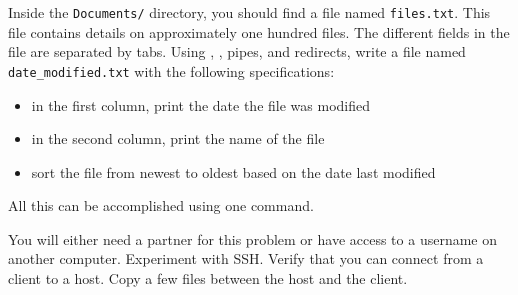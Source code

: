 Inside the \texttt{Documents/} directory, you should find a file named \texttt{files.txt}.
This file contains details on approximately one hundred files.
The different fields in the file are separated by tabs.
Using , , pipes, and redirects, write a file named \texttt{date\_modified.txt} with the following specifications:
\begin{itemize}
\item in the first column, print the date the file was modified
\item in the second column, print the name of the file
\item sort the file from newest to oldest based on the date last modified
\end{itemize}
All this can be accomplished using one command.

You will either need a partner for this problem or have access to a username on another computer.
Experiment with SSH. Verify that you can connect from a client to a host.
Copy a few files between the host and the client.
